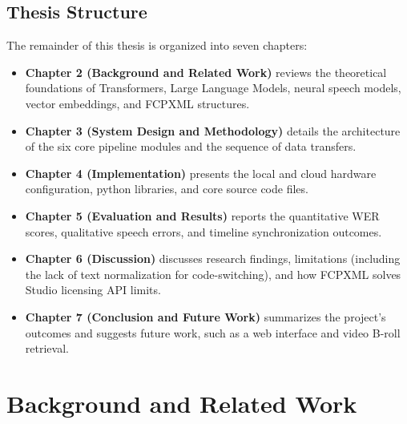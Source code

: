 \documentclass[a4paper,12pt]{report}
\begin{document}
\section{Thesis Structure}
The remainder of this thesis is organized into seven chapters:
\begin{itemize}
    \item \textbf{Chapter 2 (Background and Related Work)} reviews the theoretical foundations of Transformers, Large Language Models, neural speech models, vector embeddings, and FCPXML structures.
    \item \textbf{Chapter 3 (System Design and Methodology)} details the architecture of the six core pipeline modules and the sequence of data transfers.
    \item \textbf{Chapter 4 (Implementation)} presents the local and cloud hardware configuration, python libraries, and core source code files.
    \item \textbf{Chapter 5 (Evaluation and Results)} reports the quantitative WER scores, qualitative speech errors, and timeline synchronization outcomes.
    \item \textbf{Chapter 6 (Discussion)} discusses research findings, limitations (including the lack of text normalization for code-switching), and how FCPXML solves Studio licensing API limits.
    \item \textbf{Chapter 7 (Conclusion and Future Work)} summarizes the project's outcomes and suggests future work, such as a web interface and video B-roll retrieval.
\end{itemize}
\newpage

\chapter{Background and Related Work}
\label{ch:background}
\end{document}
